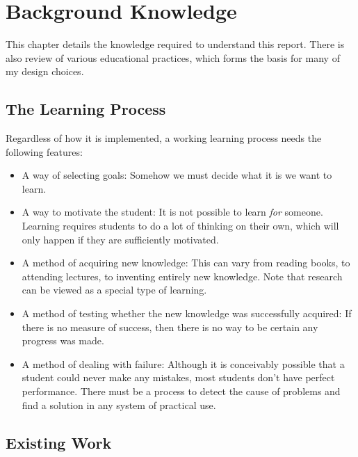 \chapter{Background Knowledge}
\label{chapter:background}
  This chapter details the knowledge required to understand this report. There is also review of various educational practices, which forms the basis for many of my design choices.

  \section{The Learning Process}
    Regardless of how it is implemented, a working learning process needs the following features:

    \begin{itemize}
      \item A way of selecting goals: Somehow we must decide what it is we want to learn.

      \item A way to motivate the student: It is not possible to learn \emph{for} someone. Learning requires students to do a lot of thinking on their own, which will only happen if they are sufficiently motivated.

      \item A method of acquiring new knowledge: This can vary from reading books, to attending lectures, to inventing entirely new knowledge. Note that research can be viewed as a special type of learning.

      \item A method of testing whether the new knowledge was successfully acquired: If there is no measure of success, then there is no way to be certain any progress was made.

      \item A method of dealing with failure: Although it is conceivably possible that a student could never make any mistakes, most students don't have perfect performance. There must be a process to detect the cause of problems and find a solution in any system of practical use.
    \end{itemize}

  \section{Existing Work}

